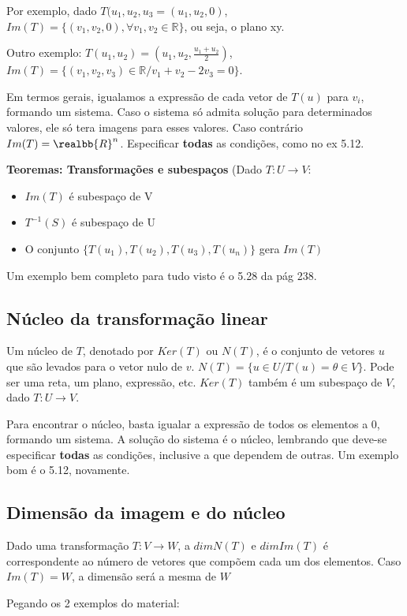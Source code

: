 \documentclass[letterpaper, 11pt]{article}
\begin{document}
Por exemplo, dado \(T(u_1, u_2, u_3 = (u_1,u_2,0)\), \(Im(T) = \{(v_1,v_2,0), \forall v_1,v_2 \in \mathbb{R}\}\), ou seja, o plano xy.

Outro exemplo: \(T(u_1,u_2) = (u_1,u_2,\frac{u_1+u_2}{2})\), \(Im(T) = \{(v_1,v_2,v_3) \in \mathbb{R} / v_1 + v_2 -2v_3 = 0\}\).

Em termos gerais, igualamos a expressão de cada vetor de \(T(u)\) para \(v_i\), formando um sistema. Caso o sistema só admita solução para determinados valores, ele só tera imagens para esses valores. Caso contrário \(Im(T) = \realbb{R}^n\). Especificar \textbf{todas} as condições, como no ex 5.12.

\textbf{Teoremas: Transformações e subespaços} (Dado \(T: U \to V\):
\begin{itemize}
\item \(Im(T)\) é subespaço de V
\item \(T^{-1}(S)\) é subespaço de U
\item O conjunto \(\{T(u_1),T(u_2),T(u_3),T(u_n)\}\) gera \(Im(T)\)
\end{itemize}

Um exemplo bem completo para tudo visto é o 5.28 da pág 238.

\subsection{Núcleo da transformação linear}
\label{sec:org7f708a2}
Um núcleo de \(T\), denotado por \(Ker(T)\) ou \(N(T)\), é o conjunto de vetores \(u\) que são levados para o vetor nulo de \(v\). \(N(T) = \{u \in U / T(u) = \theta \in V\}\). Pode ser uma reta, um plano, expressão, etc.
\(Ker(T)\) também é um subespaço de \(V\), dado \(T: U \to V\).

Para encontrar o núcleo, basta igualar a expressão de todos os elementos a 0, formando um sistema. A solução do sistema é o núcleo, lembrando que deve-se especificar \textbf{todas} as condições, inclusive a que dependem de outras. Um exemplo bom é o 5.12, novamente.

\subsection{Dimensão da imagem e do núcleo}
\label{sec:org520f6c4}
Dado uma transformação \(T: V \to W\), a \(dimN(T)\) e \(dimIm(T)\) é correspondente ao número de vetores que compõem cada um dos elementos. Caso \(Im(T) = W\), a dimensão será a mesma de \(W\)

Pegando os 2 exemplos do material:
\end{document}
